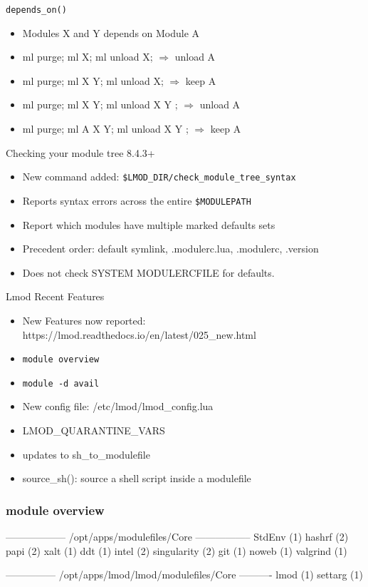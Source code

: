 \documentclass{beamer}
\begin{document}
\begin{frame}{\texttt{depends\_on()}}
  \begin{itemize}
    \item Modules X and Y depends on Module A
    \item ml purge; ml X; ml unload X;      $\Rightarrow$ unload A
    \item ml purge; ml X Y; ml unload X;    $\Rightarrow$ keep A
    \item ml purge; ml X Y; ml unload X Y ; $\Rightarrow$ unload A
    \item ml purge; ml A X Y; ml unload X Y ; $\Rightarrow$ keep A
  \end{itemize}
\end{frame}

\begin{frame}{Checking your module tree 8.4.3+}
  \begin{itemize}
    \item New command added: \texttt{\$LMOD\_DIR/check\_module\_tree\_syntax}
    \item Reports syntax errors across the entire \texttt{\$MODULEPATH}
    \item Report which modules have multiple marked defaults sets
    \item Precedent order: default symlink, .modulerc.lua, .modulerc, .version
    \item Does not check SYSTEM MODULERCFILE for defaults.
  \end{itemize}
\end{frame}

\begin{frame}{Lmod Recent Features}
  \begin{itemize}
    \item New Features now reported:
      https://lmod.readthedocs.io/en/latest/025\_new.html
    \item \texttt{module overview}
    \item \texttt{module -d avail}
    \item New config file: /etc/lmod/lmod\_config.lua
    \item LMOD\_QUARANTINE\_VARS
    \item updates to sh\_to\_modulefile
    \item source\_sh(): source a shell script inside a modulefile
  \end{itemize}
\end{frame}

\begin{frame}[fragile]
  \frametitle{module overview}
    {\tiny
\begin{semiverbatim}
------------------ /opt/apps/modulefiles/Core -----------------
StdEnv    (1)   hashrf    (2)   papi        (2)   xalt     (1)
ddt       (1)   intel     (2)   singularity (2)
git       (1)   noweb     (1)   valgrind    (1)

--------------- /opt/apps/lmod/lmod/modulefiles/Core ----------
lmod (1)   settarg (1)    
\end{semiverbatim}
    }
\end{frame}
\end{document}
